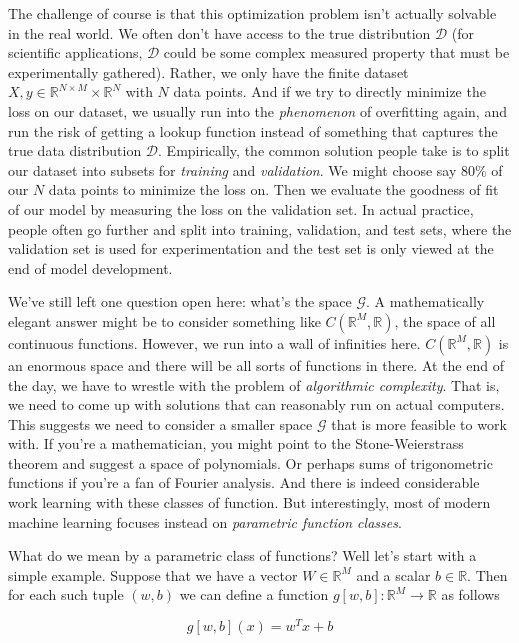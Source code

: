 \documentclass[book.tex]{subfiles}
\begin{document}
The challenge of course is that this optimization problem isn't actually solvable in the real world. We often don't have access to the true distribution $\mathcal{D}$ (for scientific applications, $\mathcal{D}$ could be some complex measured property that must be experimentally gathered). Rather, we only have the finite dataset $X, y \in \mathbb{R}^{N\times M} \times \mathbb{R}^N$ with $N$ data points. And if we try to directly minimize the loss on our dataset, we usually run into the \textit{phenomenon} of overfitting again, and run the risk of getting a lookup function instead of something that captures the true data distribution $\mathcal{D}$. Empirically, the common solution people take is to split our dataset into subsets for \textit{training} and \textit{validation}. We might choose say 80\% of our $N$ data points to minimize the loss on. Then we evaluate the goodness of fit of our model by measuring the loss on the validation set. In actual practice, people often go further and split into training, validation, and test sets, where the validation set is used for experimentation and the test set is only viewed at the end of model development. 

We've still left one question open here: what's the space $\mathcal{G}$. A mathematically elegant answer might be to consider something like $C(\mathbb{R}^M, \mathbb{R})$, the space of all continuous functions. However, we run into a wall of infinities here. $C(\mathbb{R}^M, \mathbb{R})$ is an enormous space and there will be all sorts of functions in there. At the end of the day, we have to wrestle with the problem of \textit{algorithmic complexity}. That is, we need to come up with solutions that can reasonably run on actual computers. This suggests we need to consider a smaller space $\mathcal{G}$ that is more feasible to work with. If you're a mathematician, you might point to the Stone-Weierstrass theorem and suggest a space of polynomials. Or perhaps sums of trigonometric functions if you're a fan of Fourier analysis. And there is indeed considerable work learning with these classes of function. But interestingly, most of modern machine learning focuses instead on \textit{parametric function classes}.

What do we mean by a parametric class of functions? Well let's start with a simple example. Suppose that we have a vector $W \in \mathbb{R}^{M}$ and a scalar $b \in \mathbb{R}$. Then for each such tuple $(w, b)$ we can define a function $g[w,b]: \mathbb{R}^M \to \mathbb{R}$ as follows

\[g[w,b](x) = w^T x + b \]
\end{document}
